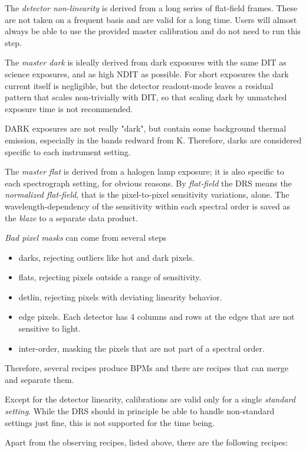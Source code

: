 The \emph{detector non-linearity} is derived from a long series of flat-field
frames. These are not taken on a frequent basis and are valid for a long time.
Users will almost always be able to use the provided master calibration and do
not need to run this step.

The \emph{master dark} is ideally derived from dark exposures with the same DIT
as science exposures, and as high NDIT as possible. For short exposures the dark
current itself is negligible, but the detector readout-mode leaves a residual
pattern that scales non-trivially with DIT, so that scaling dark by unmatched
exposure time is not recommended.

DARK exposures are not really "dark", but contain some background thermal
emission, especially in the bands redward from K. Therefore, darks are
considered specific to each instrument setting.

The \emph{master flat} is derived from a halogen lamp exposure; it is also
specific to each spectrograph setting, for obvious reasons. By \emph{flat-field}
the DRS means the \emph{normalized flat-field}, that is the pixel-to-pixel
sensitivity variations, alone. The wavelength-dependency of the sensitivity
within each spectral order is saved as the \emph{blaze} to a separate data
product.

\emph{Bad pixel masks} can come from several steps
\begin{itemize}
    \item darks, rejecting outliers like hot and dark pixels.
    \item flats, rejecting pixels outside a range of sensitivity.
    \item detlin, rejecting pixels with deviating linearity behavior.
    \item edge pixels. Each detector has 4 columns and rows at the edges that
        are not sensitive to light.
    \item inter-order, masking the pixels that are not part of a spectral order.
\end{itemize}

Therefore, several recipes produce BPMs and there are recipes that can merge
and separate them.

Except for the detector linearity, calibrations are valid only for a
single \textit{standard setting}. While the DRS should in principle be able to
handle non-standard settings just fine, this is not supported for the time
being.

Apart from the observing recipes, listed above, there are the following recipes:

